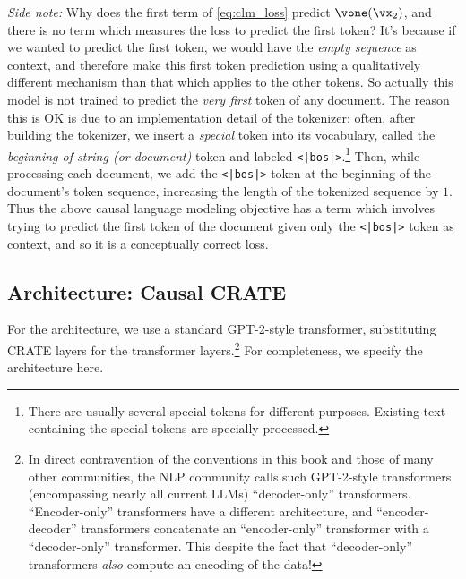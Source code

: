 \documentclass[../../book-main.tex]{subfiles}
\begin{document}
\textit{Side note:} Why does the first term of \eqref{eq:clm_loss}
predict \(\vone(\vx_{2})\), and there is no term which measures the
loss to predict the first token? It's because if we wanted to predict
the first token, we would have the \textit{empty sequence} as
context, and therefore make this first token prediction using a
qualitatively different mechanism than that which applies to the
other tokens. So actually this model is not trained to predict the
\textit{very first} token of any document. The reason this is OK is
due to an implementation detail of the tokenizer: often, after
building the tokenizer, we insert a \textit{special} token into its
vocabulary, called the \textit{beginning-of-string (or document)}
token and labeled \texttt{<|bos|>}.\footnote{There are usually
several special tokens for different purposes. Existing text
containing the special tokens are specially processed.} Then, while
processing each document, we add the \texttt{<|bos|>} token at the
beginning of the document's token sequence, increasing the length of
the tokenized sequence by \(1\). Thus the above causal language
modeling objective has a term which involves trying to predict the
first token of the document given only the \texttt{<|bos|>} token as
context, and so it is a conceptually correct loss.

\subsection{Architecture: Causal CRATE}

For the architecture, we use a standard GPT-2-style transformer,
substituting CRATE layers for the transformer layers.\footnote{In
direct contravention of the conventions in this book and those of
many other communities, the NLP community calls such GPT-2-style
transformers (encompassing nearly all current LLMs) ``decoder-only''
transformers. ``Encoder-only'' transformers have a different
architecture, and ``encoder-decoder'' transformers concatenate an
``encoder-only'' transformer with a ``decoder-only'' transformer.
This despite the fact that ``decoder-only'' transformers
\textit{also} compute an encoding of the data!} For completeness, we
specify the architecture here.
\end{document}

